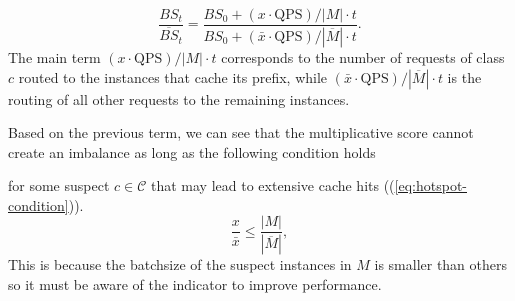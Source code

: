 \begin{equation}
\frac{BS_{t}}{\overline{BS}_{t}}
  = \frac{
      BS_0 + \left( x \cdot \text{QPS}\right) / |M| \cdot t
    }{
      BS_0 + \left( \bar{x} \cdot \text{QPS}\right) / |\overline{M}| \cdot t
    }.
\label{eq:bs-ratio-exact}
\end{equation}
The main term
\(\left( x \cdot \text{QPS}\right) / |M| \cdot t\) corresponds to the number of 
requests of class \(c\) routed to the instances that cache its prefix,
while \(\left( \bar{x} \cdot \text{QPS}\right) / |\overline{M}| \cdot t\) is the
routing of all other requests to the remaining instances.

\iffalse
{}
Based on the previous term, 
we can see that the multiplicative score 
cannot create an imbalance as long as the following condition holds

for some suspect \(c\in\mathcal{C}\) that may lead to extensive cache hits ((\ref{eq:hotspot-condition})). 
\begin{equation}
  \frac{x}{\bar{x}} \leq \frac{|M|}{|\overline{M}|},
\label{eq:hotspot-condition}
\end{equation}
This is because the batchsize of the suspect instances in \(M\) is smaller than others 
so it must be aware of the {\kvcache} indicator to improve performance. 

